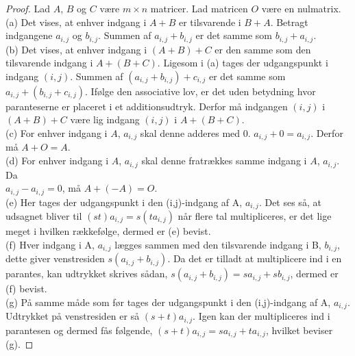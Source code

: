 \begin{proof} 
Lad $A$, $B$ og $C$ være $m \times n$ matricer. Lad matricen $O$ være en nulmatrix. \\
(a) Det vises, at enhver indgang i $A + B$ er tilsvarende i $B + A$. Betragt indgangene $a_{i,j}$ og $b_{i,j}$. Summen af $a_{i,j} + b_{i,j}$ er det samme som $b_{i,j} + a_{i,j}$. \\
(b) Det vises, at enhver indgang i $(A + B) + C$ er den samme som den tilsvarende indgang i $A + (B + C)$. Ligesom i (a) tages der udgangspunkt i indgang $(i,j)$. Summen af $(a_{i,j} + b_{i,j}) + c_{i,j}$ er det samme som $a_{i,j} + (b_{i,j} + c_{i,j})$. Ifølge den associative lov, er det uden betydning hvor paranteserne er placeret i et additionsudtryk. Derfor må indgangen $(i,j)$ i $(A + B) + C$ være lig indgang $(i,j)$ i $A + (B + C)$. \\
(c) For enhver indgang i $A$, $a_{i,j}$ skal denne adderes med $0$. $a_{i,j}+0=a_{i,j}$. Derfor må $A + O = A$. \\
(d) For enhver indgang i $A$, $a_{i,j}$ skal denne fratrækkes samme indgang i $A$, $a_{i,j}$. Da \\ $a_{i,j} - a_{i,j} = 0$, må $A + (-A) = O$. \\
(e) Her tages der udgangspunkt i den (i,j)-indgang af A, $a_{i,j}$. Det ses så, at udsagnet bliver til $(st)a_{i,j} = s(ta_{i,j})$ når flere tal multipliceres, er det lige meget i hvilken rækkefølge, dermed er (e) bevist. \\
(f) Hver indgang i A, $a_{i,j}$ lægges sammen med den tilsvarende indgang i B, $b_{i,j}$, dette giver venstresiden $s(a_{i,j}+b_{i,j})$. Da det er tilladt at multiplicere ind i en parantes, kan udtrykket skrives sådan, $s(a_{i,j}+b_{i,j})=sa_{i,j}+sb_{i,j}$, dermed er (f) bevist. \\
(g) På samme måde som før tages der udgangspunkt i den (i,j)-indgang af A, $a_{i,j}$. Udtrykket på venstresiden er så $(s+t)a_{i,j}$. Igen kan der multipliceres ind i parantesen og dermed fås følgende, $(s+t)a_{i,j}=sa_{i,j}+ta_{i,j}$, hvilket beviser (g).
\end{proof}

